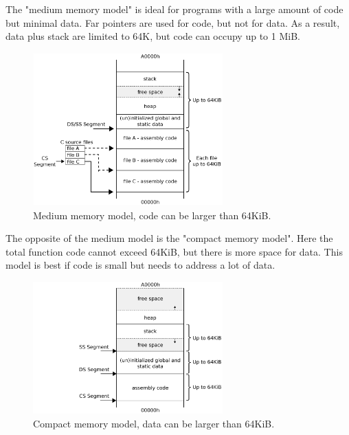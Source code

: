 \par
The "medium memory model" is ideal for programs with a large amount of code but minimal data. Far pointers are used for code, but not for data. As a result, data
plus stack are limited to 64K, but code can occupy up to 1 MiB. 
\vspace{-2pt}
\begin{figure}[H]
\centering
\includegraphics[width=0.65\textwidth]{imgs/drawings/memory/medium_mm_v2.eps}
\caption{Medium memory model, code can be larger than 64KiB.}
\label{fig:mm_medium}
\end{figure}

\par
The opposite of the medium model is the "compact memory model". Here the total function code cannot exceed 64KiB, but there is more space for data. This model is best if code is small but needs to address a lot of data.
\vspace{-2pt}
\begin{figure}[H]
\centering
\includegraphics[width=0.65\textwidth]{imgs/drawings/memory/compact_mm_v2.eps}
\caption{Compact memory model, data can be larger than 64KiB.}
\label{fig:mm_compact}
\end{figure}

